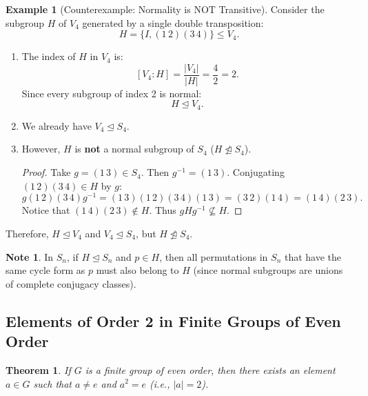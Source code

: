 \documentclass[12pt]{article}
\theoremstyle{definition}
\newtheorem{example}[definition]{Example}
\newtheorem*{note}{Note}
\theoremstyle{plain}
\newtheorem{theorem}{Theorem}[section]
\begin{document}
\begin{example}[Counterexample: Normality is NOT Transitive]
Consider the subgroup $H$ of $V_4$ generated by a single double transposition:
\[
H = \{ I, (1\,2)(3\,4) \} \le V_4.
\]
\begin{enumerate}
    \item The index of $H$ in $V_4$ is:
    \[
    [V_4 : H] = \frac{|V_4|}{|H|} = \frac{4}{2} = 2.
    \]
    Since every subgroup of index 2 is normal:
    \[
    H \trianglelefteq V_4.
    \]
    \item We already have $V_4 \trianglelefteq S_4$.
    \item However, $H$ is \textbf{not} a normal subgroup of $S_4$ ($H \not\trianglelefteq S_4$).
    \begin{proof}
    Take $g = (1\,3) \in S_4$. Then $g^{-1} = (1\,3)$. Conjugating $(1\,2)(3\,4) \in H$ by $g$:
    \[
    g (1\,2)(3\,4) g^{-1} = (1\,3)(1\,2)(3\,4)(1\,3) = (3\,2)(1\,4) = (1\,4)(2\,3).
    \]
    Notice that $(1\,4)(2\,3) \notin H$. Thus $g H g^{-1} \not\subseteq H$.
    \end{proof}
\end{enumerate}
Therefore, $H \trianglelefteq V_4$ and $V_4 \trianglelefteq S_4$, but $H \not\trianglelefteq S_4$.
\end{example}

\begin{note}
In $S_n$, if $H \trianglelefteq S_n$ and $p \in H$, then all permutations in $S_n$ that have the same cycle form as $p$ must also belong to $H$ (since normal subgroups are unions of complete conjugacy classes).
\end{note}

\subsection{Elements of Order 2 in Finite Groups of Even Order}

\begin{theorem}
If $G$ is a finite group of even order, then there exists an element $a \in G$ such that $a \neq e$ and $a^2 = e$ (i.e., $|a| = 2$).
\end{theorem}
\end{document}
